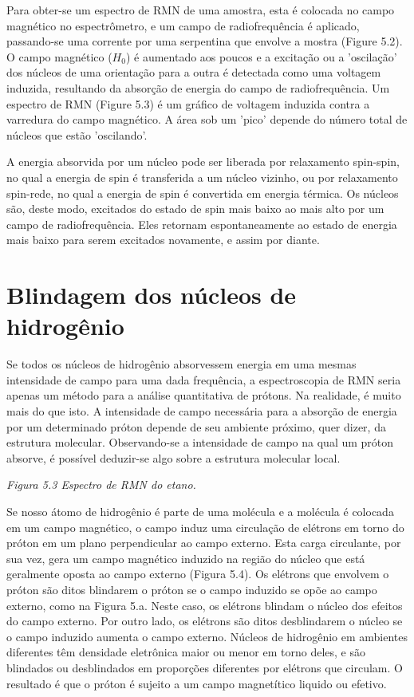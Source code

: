 Para obter-se um espectro de RMN de uma amostra, esta é colocada no campo magnético no espectrômetro, e um campo de radiofrequência é aplicado, passando-se uma corrente por uma serpentina que envolve a mostra (Figure 5.2). O campo magnético ($H_0$) é aumentado aos poucos e a excitação ou a 'oscilação' dos núcleos de uma orientação para a outra é detectada como uma voltagem induzida, resultando da absorção de energia do campo de radiofrequência. Um espectro de RMN (Figure 5.3) é um gráfico de voltagem induzida contra a varredura do campo magnético. A área sob um 'pico' depende do número total de núcleos que estão 'oscilando'.

A energia absorvida por um núcleo pode ser liberada por relaxamento spin-spin, no qual a energia de spin é transferida a um núcleo vizinho, ou por relaxamento spin-rede, no qual a energia de spin é convertida em energia térmica. Os núcleos são, deste modo, excitados do estado de spin mais baixo ao mais alto por um campo de radiofrequência. Eles retornam espontaneamente ao estado de energia mais baixo para serem excitados novamente, e assim por diante.

\section{Blindagem dos núcleos de hidrogênio}
Se todos os núcleos de hidrogênio absorvessem energia em uma mesmas intensidade de campo para uma dada frequência, a espectroscopia de RMN seria apenas um método para a análise quantitativa de prótons. Na realidade, é muito mais do que isto. A intensidade de campo necessária para a absorção de energia por um determinado próton depende de seu ambiente próximo, quer dizer, da estrutura molecular. Observando-se a intensidade de campo na qual um próton absorve, é possível deduzir-se algo sobre a estrutura molecular local.

\emph{Figura 5.3 Espectro de RMN do etano.}

Se nosso átomo de hidrogênio é parte de uma molécula e a molécula é colocada em um campo magnético, o campo induz uma circulação de elétrons em torno do próton em um plano perpendicular ao campo externo. Esta carga circulante, por sua vez, gera um campo magnético induzido na região do núcleo que está geralmente oposta ao campo externo (Figura 5.4). Os elétrons que envolvem o próton são ditos blindarem o próton se o campo induzido se opõe ao campo externo, como na Figura 5.a. Neste caso, os elétrons blindam o núcleo dos efeitos do campo externo. Por outro lado, os elétrons são ditos desblindarem o núcleo se o campo induzido aumenta o campo externo. Núcleos de hidrogênio em ambientes diferentes têm densidade eletrônica maior ou menor em torno deles, e são blindados ou desblindados em proporções diferentes por elétrons que circulam. O resultado é que o próton é sujeito a um campo magnetítico liquido ou efetivo.

